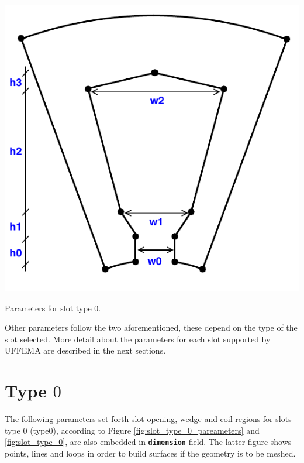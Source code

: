 \documentclass{tufte-book} %
\begin{document}
\begin{marginfigure}
\includegraphics[width=\linewidth]{Slot_Type_0_parameters.pdf}
\caption{Parameters for slot type $0$.}
\label{fig:slot_type_0_pareameters}
\end{marginfigure}

Other parameters follow the two aforementioned, these depend on the type of the slot selected. More detail about the parameters for each slot supported by UFFEMA are described in the next sections.

\section[Type 0]{Type $0$}
The following parameters set forth slot opening, wedge and coil regions for slots type $0$ (type$0$), according to Figure \ref{fig:slot_type_0_pareameters} and \ref{fig:slot_type_0}, are also embedded in \texttt{\textbf{dimension}} field.  The latter figure shows points, lines and loops in order to build surfaces if the geometry is to be meshed. 
\end{document}

